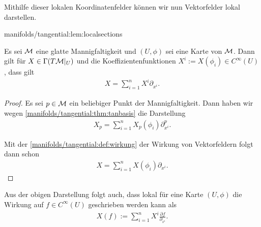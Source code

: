 \par
Mithilfe dieser lokalen Koordinatenfelder können wir nun Vektorfelder lokal darstellen.
\begin{lemma}{}{manifolds/tangential:lem:localsections}



\par
Es sei \(\mathcal{M}\) eine glatte Mannigfaltigkeit und \((U,\phi)\) sei eine Karte von \(\mathcal{M}\).
Dann gilt für \(X\in\Gamma(T\mathcal{M}\rvert_U)\) und die Koeffizientenfunktionen \(X^i:=X(\phi_i)\in C^\infty(U)\), dass gilt
\begin{align*}
X = \sum_{i=1}^n X^i \partial_{x^{i}}.
\end{align*}\end{lemma}

\begin{proof}
 Es sei \(p\in\mathcal{M}\) ein beliebiger Punkt der Mannigfaltigkeit.
Dann haben wir wegen \cref{manifolds/tangential:thm:tanbasis} die Darstellung
\begin{align*}
X_p = \sum_{i=1}^n X_p(\phi_i) \partial_{x^i}^p.
\end{align*}
\par
Mit der \cref{manifolds/tangential:def:wirkung} der Wirkung von Vektorfeldern folgt dann schon
\begin{align*}
X = \sum_{i=1}^n X(\phi_i) \partial_{x^i}.
\end{align*}\end{proof}

\par
Aus der obigen Darstellung folgt auch, dass lokal für eine Karte \((U,\phi)\) die Wirkung auf \(f\in C^\infty(U)\) geschrieben werden kann als
\begin{align*}
X(f) := \sum_{i=1}^n X^i \frac{\partial f}{\partial_{x^i}}.
\end{align*}

